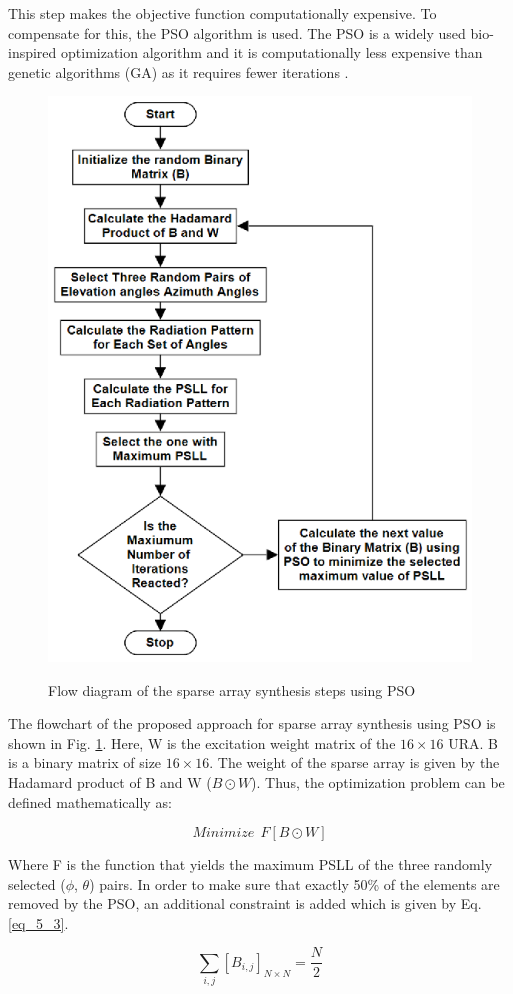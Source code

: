 This step makes the objective function computationally expensive. To compensate for this, the PSO algorithm is used. The PSO is a widely used bio-inspired optimization algorithm and it is computationally less expensive than genetic algorithms (GA) as it requires fewer iterations \cite{pso_vs_ga}.

\begin{figure}
  \centering
  \includegraphics[width=0.5\linewidth]{Fig-naun_6.eps}\\
  \caption{Flow diagram of the sparse array synthesis steps using PSO} \label{fig_5_6}
\end{figure}

The flowchart of the proposed approach for sparse array synthesis using PSO is shown in Fig. \ref{fig_5_6}. Here, W is the excitation weight matrix of the $16\times 16$ URA. B is a binary matrix of size $16\times 16$. The weight of the sparse array is given by the Hadamard product of B and W ($B \odot W$). Thus, the optimization problem can be defined mathematically as:

\begin{equation} \label{eq_5_2}
Minimize~~F[B \odot W]
\end{equation}

Where F is the function that yields the maximum PSLL of the three randomly selected ($\phi$, $\theta$) pairs. In order to make sure that exactly 50\% of the elements are removed by the PSO, an additional constraint is added which is given by Eq. \ref{eq_5_3}.

\begin{equation}\label{eq_5_3}
\sum_{i,j}{\left[B_{i,j}\right]_{N\times N}} = \frac{N}{2}
\end{equation}

